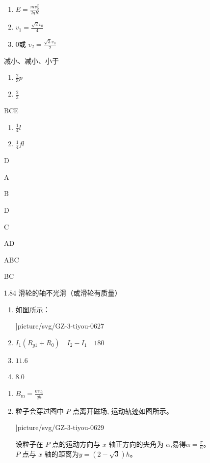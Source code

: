 \item \begin {enumerate} \item $E=\frac {m v_{0}^{2}}{2 q R}$ \item $v_{1}=\frac {\sqrt {2} v_{0}}{4}$ \item $ 0 $或 $v_{2}=\frac {\sqrt {3} v_{0}}{2}$ \end {enumerate}
\item 减小、减小、小于
\item \begin {enumerate} \item $ \frac { 2 }{ 3 } p $ \item $ \frac { 2 }{ 3 } $ \end {enumerate}
\item BCE
\item \begin {enumerate} \item $\frac {1}{4} l$ \item $\frac {1}{4} f l$ \end {enumerate}
\item D
\item A
\item B
\item D
\item C
\item AD
\item ABC
\item BC
\item 1.84  \quad 滑轮的轴不光滑（或滑轮有质量）
\item \begin {enumerate} \item 如图所示： \begin {center} \linewidth ]{picture/svg/GZ-3-tiyou-0627} \end {center} \item $I_{1}\left (R_{g1}+R_{0}\right ) \quad I_{2}-I_{1} \quad 180$ \item $ 11.6 $ \item $ 8.0 $ \end {enumerate}
\item \begin {enumerate} \item $B_{\mathrm {m}}=\frac {m v_{0}}{q h}$ \item 粒子会穿过图中 $P$ 点离开磁场, 运动轨迹如图所示。 \begin {center} \linewidth ]{picture/svg/GZ-3-tiyou-0629} \end {center} 设粒子在 $P$ 点的运动方向与 $x$ 轴正方向的夹角为 $\alpha $,易得$\alpha =\frac {\pi }{6}$。 \\ $P$ 点与 $x$ 轴的距离为$y=(2-\sqrt {3}) h$。 \end {enumerate}
